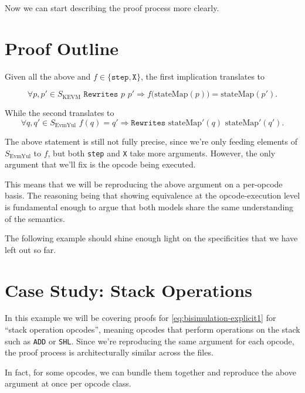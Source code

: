 Now we can start describing the proof process more clearly.

\section{Proof Outline}

Given all the above and $f\in\{\texttt{step}, \texttt{X}\}$, the first
implication translates to

\begin{equation}\label{eq:bisimulation-explicit1}
\forall p, p'\in S_{\text{KEVM}}\,\, \texttt{Rewrites}\,\, p \,\, p'
\Rightarrow f\bigl(\text{stateMap}(p)\bigr) = \text{stateMap}(p').
\end{equation}

While the second translates to
\begin{equation}\label{eq:bisimulation-explicit2}
\forall q, q'\in S_{\text{EvmYul}}\,\, f(q) = q' \Rightarrow
\texttt{Rewrites}\,\, \text{stateMap}'(q)\,\, \text{stateMap}'(q').
\end{equation}

The above statement is still not fully precise, since we're only feeding
elements of $S_{\text{EvmYul}}$ to $f$, but both \texttt{step} and \texttt{X}
take more arguments. However, the only argument that we'll fix is the opcode
being executed.

This means that we will be reproducing the above argument on a per-opcode basis.
The reasoning being that showing equivalence at the opcode-execution level is
fundamental enough to argue that both models share the same understanding of the
semantics.

The following example should shine enough light on the
specificities that we have left out so far.

\section{Case Study: Stack Operations}

In this example we will be covering proofs for \ref{eq:bisimulation-explicit1}
for ``stack operation opcodes'', meaning opcodes that perform operations on the
stack such as \texttt{ADD} or \texttt{SHL}. Since we're reproducing the same
argument for each opcode, the proof process is architecturally similar across
the files.

In fact, for some opcodes, we can bundle them together and reproduce the above
argument at once per opcode class.


